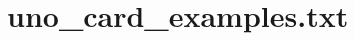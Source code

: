 \hypertarget{uno_card_examples_8txt-example}{
\section{uno\-\_\-card\-\_\-examples.\-txt}
}

\begin{DoxyCodeInclude}
\end{DoxyCodeInclude}
 